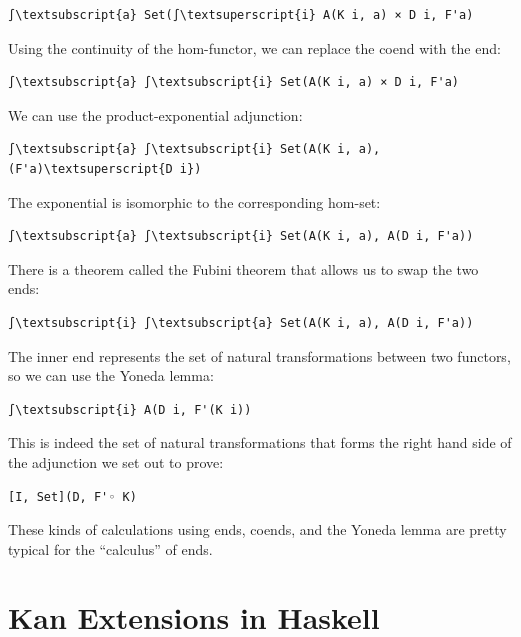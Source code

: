 \begin{Verbatim}[commandchars=\\\{\}]
∫\textsubscript{a} Set(∫\textsuperscript{i} A(K i, a) × D i, F'a)
\end{Verbatim}
Using the continuity of the hom-functor, we can replace the coend with
the end:

\begin{Verbatim}[commandchars=\\\{\}]
∫\textsubscript{a} ∫\textsubscript{i} Set(A(K i, a) × D i, F'a)
\end{Verbatim}
We can use the product-exponential adjunction:

\begin{Verbatim}[commandchars=\\\{\}]
∫\textsubscript{a} ∫\textsubscript{i} Set(A(K i, a), (F'a)\textsuperscript{D i})
\end{Verbatim}
The exponential is isomorphic to the corresponding hom-set:

\begin{Verbatim}[commandchars=\\\{\}]
∫\textsubscript{a} ∫\textsubscript{i} Set(A(K i, a), A(D i, F'a))
\end{Verbatim}
There is a theorem called the Fubini theorem that allows us to swap the
two ends:

\begin{Verbatim}[commandchars=\\\{\}]
∫\textsubscript{i} ∫\textsubscript{a} Set(A(K i, a), A(D i, F'a))
\end{Verbatim}
The inner end represents the set of natural transformations between two
functors, so we can use the Yoneda lemma:

\begin{Verbatim}[commandchars=\\\{\}]
∫\textsubscript{i} A(D i, F'(K i))
\end{Verbatim}
This is indeed the set of natural transformations that forms the right
hand side of the adjunction we set out to prove:

\begin{Verbatim}[commandchars=\\\{\}]
[I, Set](D, F'◦ K)
\end{Verbatim}
These kinds of calculations using ends, coends, and the Yoneda lemma are
pretty typical for the ``calculus'' of ends.

\section{Kan Extensions in Haskell}\label{kan-extensions-in-haskell}

